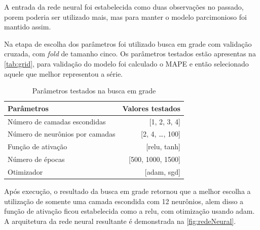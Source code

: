 \documentclass[
    12pt,
    oneside,
    a4paper,
    english,
    brazil
]{abntex2}
\begin{document}
A entrada da rede neural foi estabelecida como duas observações no passado,
porem poderia ser utilizado mais, mas para manter o modelo parcimonioso foi
mantido assim.

Na etapa de escolha dos parâmetros foi utilizado busca em grade com validação
cruzada, com \textit{fold} de tamanho cinco. Os parâmetros testados estão
apresentas na \autoref{tab:grid}, para validação do modelo foi calculado o MAPE
e então selecionado aquele que melhor representou a série.

\begin{table}
    \centering
    \caption{Parâmetros testados na busca em grade}\label{tab:grid}
    \begin{tabular}{ l r }
        \toprule
        Parâmetros                      & Valores testados\\
        \midrule
        Número de camadas escondidas    & [1, 2, 3, 4]\\
        Número de neurônios por camadas & [2, 4, \ldots, 100]\\
        Função de ativação              & [relu, tanh]\\
        Número de épocas                & [500, 1000, 1500]\\
        Otimizador                      & [adam, sgd]\\
        \bottomrule
    \end{tabular}
\end{table}

Após execução, o resultado da busca em grade retornou que a melhor escolha a
utilização de somente uma camada escondida com 12 neurônios, alem disso a
função de ativação ficou estabelecida como a relu, com otimização usando adam.
A arquitetura da rede neural resultante é demonstrada na
\autoref{fig:redeNeural}.
\end{document}
